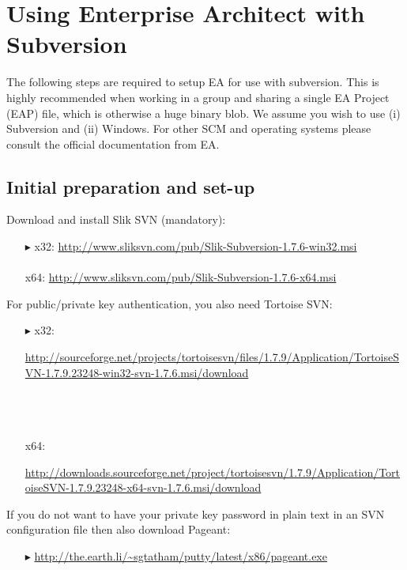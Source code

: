 \newpage
\section{Using Enterprise Architect with Subversion}
\visHeader

The following steps are required to setup EA for use with subversion. This is highly recommended when working in a group and sharing a single EA Project (EAP)
file, which is otherwise a huge binary blob. We assume you wish to use (i) Subversion and (ii) Windows. For other SCM and operating systems please consult the
official documentation from EA.



\subsection{Initial preparation and set-up}

Download and install Slik SVN (mandatory):
\begin{enumerate}
  \item[$\blacktriangleright$] x32: \small{\url{http://www.sliksvn.com/pub/Slik-Subversion-1.7.6-win32.msi}}\\\\
   x64: {\small \url{http://www.sliksvn.com/pub/Slik-Subversion-1.7.6-x64.msi}}
\end{enumerate}

For public/private key authentication, you also need Tortoise SVN:

\begin{enumerate}
  \item[$\blacktriangleright$] x32: {\small \begin{minipage}{.95\textwidth} 
  \url{http://sourceforge.net/projects/tortoisesvn/files/1.7.9/Application/TortoiseSVN-1.7.9.23248-win32-svn-1.7.6.msi/download}
    \end{minipage}}\\\\\\
  x64: {\small\begin{minipage}{.9\textwidth} 
  \url{http://downloads.sourceforge.net/project/tortoisesvn/1.7.9/Application/TortoiseSVN-1.7.9.23248-x64-svn-1.7.6.msi/download}\end{minipage}}
\end{enumerate}

If you do not want to have your private key password in plain text in an SVN configuration file then also download Pageant:
\begin{enumerate}
  \item[$\blacktriangleright$] {\small \url{http://the.earth.li/~sgtatham/putty/latest/x86/pageant.exe}}
\end{enumerate}


